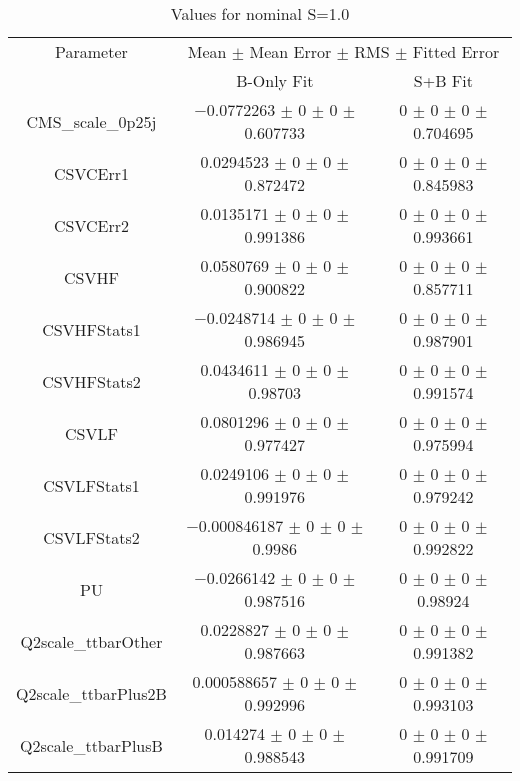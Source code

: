 \begin{table}
\centering
\caption{Values for nominal S=1.0}
\begin{tabular}{ccc}
\toprule
Parameter & \multicolumn{2}{c}{Mean $\pm$ Mean Error $\pm$ RMS $\pm$ Fitted Error}\\
 & B-Only Fit & S+B Fit\\
\midrule
CMS\_scale\_0p25j & \num{-0.0772263} $\pm$ \num{0} $\pm$ \num{0} $\pm$ \num{0.607733} & \num{0} $\pm$ \num{0} $\pm$ \num{0} $\pm$ \num{0.704695}\\
CSVCErr1 & \num{0.0294523} $\pm$ \num{0} $\pm$ \num{0} $\pm$ \num{0.872472} & \num{0} $\pm$ \num{0} $\pm$ \num{0} $\pm$ \num{0.845983}\\
CSVCErr2 & \num{0.0135171} $\pm$ \num{0} $\pm$ \num{0} $\pm$ \num{0.991386} & \num{0} $\pm$ \num{0} $\pm$ \num{0} $\pm$ \num{0.993661}\\
CSVHF & \num{0.0580769} $\pm$ \num{0} $\pm$ \num{0} $\pm$ \num{0.900822} & \num{0} $\pm$ \num{0} $\pm$ \num{0} $\pm$ \num{0.857711}\\
CSVHFStats1 & \num{-0.0248714} $\pm$ \num{0} $\pm$ \num{0} $\pm$ \num{0.986945} & \num{0} $\pm$ \num{0} $\pm$ \num{0} $\pm$ \num{0.987901}\\
CSVHFStats2 & \num{0.0434611} $\pm$ \num{0} $\pm$ \num{0} $\pm$ \num{0.98703} & \num{0} $\pm$ \num{0} $\pm$ \num{0} $\pm$ \num{0.991574}\\
CSVLF & \num{0.0801296} $\pm$ \num{0} $\pm$ \num{0} $\pm$ \num{0.977427} & \num{0} $\pm$ \num{0} $\pm$ \num{0} $\pm$ \num{0.975994}\\
CSVLFStats1 & \num{0.0249106} $\pm$ \num{0} $\pm$ \num{0} $\pm$ \num{0.991976} & \num{0} $\pm$ \num{0} $\pm$ \num{0} $\pm$ \num{0.979242}\\
CSVLFStats2 & \num{-0.000846187} $\pm$ \num{0} $\pm$ \num{0} $\pm$ \num{0.9986} & \num{0} $\pm$ \num{0} $\pm$ \num{0} $\pm$ \num{0.992822}\\
PU & \num{-0.0266142} $\pm$ \num{0} $\pm$ \num{0} $\pm$ \num{0.987516} & \num{0} $\pm$ \num{0} $\pm$ \num{0} $\pm$ \num{0.98924}\\
Q2scale\_ttbarOther & \num{0.0228827} $\pm$ \num{0} $\pm$ \num{0} $\pm$ \num{0.987663} & \num{0} $\pm$ \num{0} $\pm$ \num{0} $\pm$ \num{0.991382}\\
Q2scale\_ttbarPlus2B & \num{0.000588657} $\pm$ \num{0} $\pm$ \num{0} $\pm$ \num{0.992996} & \num{0} $\pm$ \num{0} $\pm$ \num{0} $\pm$ \num{0.993103}\\
Q2scale\_ttbarPlusB & \num{0.014274} $\pm$ \num{0} $\pm$ \num{0} $\pm$ \num{0.988543} & \num{0} $\pm$ \num{0} $\pm$ \num{0} $\pm$ \num{0.991709}\\

\end{tabular}
\end{table}
